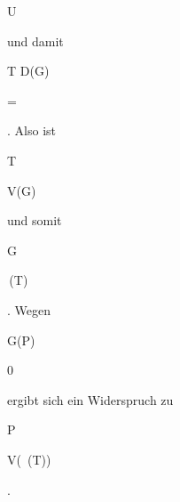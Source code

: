 {{{ \subseteq }{ U
}


{    }{
}


{   }{
}


}
{}{}{}
und damit


\mavergleichskette


{\vergleichskette


{ T \cap D(G)
}


{ = }{ \emptyset
}


{  }{
}


{    }{
}


{   }{
}


}
{}{}{.}
Also ist


\mavergleichskette


{\vergleichskette


{ T
}


{ \subseteq }{ V(G)
}


{  }{
}


{    }{
}


{   }{
}


}
{}{}{}
und somit


\mavergleichskette


{\vergleichskette


{ G
}


{ \in }{  \,(T)
}


{  }{
}


{    }{
}


{   }{
}


}
{}{}{.}
Wegen


\mavergleichskette


{\vergleichskette


{ G(P)
}


{ \neq }{ 0
}


{  }{
}


{    }{
}


{   }{
}


}
{}{}{}
ergibt sich ein Widerspruch zu


\mavergleichskette


{\vergleichskette


{ P
}


{ \in }{ V(  \,(T))
}


{  }{
}


{    }{
}


{   }{
}


}
{}{}{.}


}




